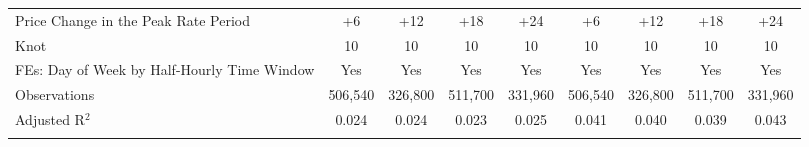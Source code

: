 \begin{table}[!htbp]
\begin{tabular}{@{\extracolsep{10pt}}lcccccccc}
Price Change in the Peak Rate Period & +6 & +12 & +18 & +24 & +6 & +12 & +18 & +24 \\ 
Knot & 10 & 10 & 10 & 10 & 10 & 10 & 10 & 10 \\ 
FEs: Day of Week by Half-Hourly Time Window & Yes & Yes & Yes & Yes & Yes & Yes & Yes & Yes \\ 
Observations & 506,540 & 326,800 & 511,700 & 331,960 & 506,540 & 326,800 & 511,700 & 331,960 \\ 
Adjusted R$^{2}$ & 0.024 & 0.024 & 0.023 & 0.025 & 0.041 & 0.040 & 0.039 & 0.043 \\ 
\hline 
\hline \\[-1.8ex] 
\end{tabular} 
\end{table} 
